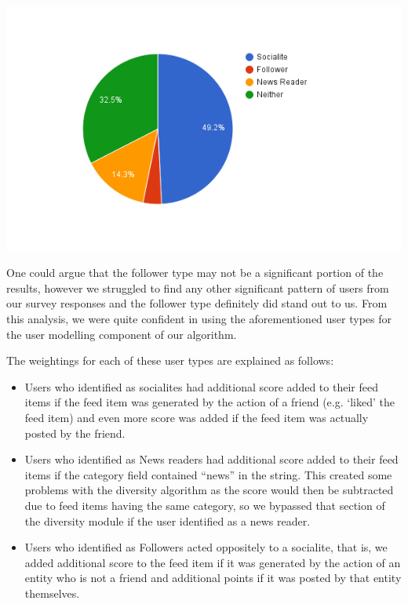 \begin{center}
\includegraphics[scale=0.8]{images/usermodelChart2.png}
\end{center}

One could argue that the follower type may not be a significant portion of the results, however we struggled to find any other significant pattern of users from our survey responses and the follower type definitely did stand out to us. From this analysis, we were quite confident in using the aforementioned user types for the user modelling component of our algorithm.

The weightings for each of these user types are explained as follows:
\begin{itemize}
\item Users who identified as socialites had additional score added to their feed items if the feed item was generated by the action of a friend (e.g. ‘liked’ the feed item) and even more score was added if the feed item was actually posted by the friend.
\item Users who identified as News readers had additional score added to their feed items if the category field contained “news” in the string. This created some problems with the diversity algorithm as the score would then be subtracted due to feed items having the same category, so we bypassed that section of the diversity module if the user identified as a news reader.
\item Users who identified as Followers acted oppositely to a socialite, that is, we added additional score to the feed item if it was generated by the action of an entity who is not a friend and additional points if it was posted by that entity themselves.
\end{itemize}


